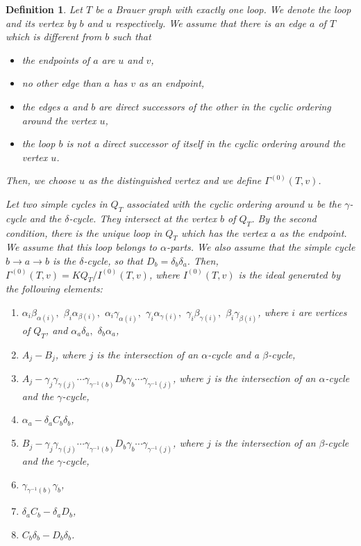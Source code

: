 \documentclass[12pt]{amsart}
\newtheorem{definition}[thm]{Definition}
\numberwithin{equation}{thm}
\newcounter{ni}
\begin{document}
\begin{definition}\label{D defn II}
Let $T$ be a Brauer graph with exactly one loop. 
We denote the loop and its vertex by $b$ and $u$ respectively. 
We assume that there is an edge $a$ of $T$ which is different from $b$ such that
\begin{itemize}
\item
the endpoints of $a$ are $u$ and $v$,
\item
no other edge than $a$ has $v$ as an endpoint,
\item
the edges $a$ and $b$ are direct successors of the other in the cyclic ordering around the vertex $u$,
\item
the loop $b$ is not a direct successor of itself in the cyclic ordering around the vertex $u$.
\end{itemize}
Then, we choose $u$ as the distinguished vertex and we define $\Gamma^{(0)}(T,v)$. 

Let two simple cycles in $Q_T$ associated with the cyclic ordering around $u$ be 
the $\gamma$-cycle and the $\delta$-cycle. They intersect at the vertex $b$ of $Q_T$. 
By the second condition, there is the unique loop in $Q_T$ which has the vertex $a$ as the endpoint. 
We assume that this loop belongs to $\alpha$-parts. We also assume that 
the simple cycle $b\to a \to b$ is the $\delta$-cycle, so that $D_b=\delta_b\delta_a$. Then,
$\Gamma^{(0)}(T,v) = KQ_T/I^{(0)}(T,v)$, where $I^{(0) }(T,v)$ is the ideal generated by the following elements:
\begin{enumerate}
\item $\alpha_i\beta_{\alpha(i)},$ $\beta_i\alpha_{\beta(i)},$ $\alpha_i\gamma_{\alpha(i)},$ $\gamma_i\alpha_{\gamma(i)},$  
$\gamma_i\beta_{\gamma(i)},$ $\beta_i\gamma_{\beta(i)}$, where $i$ are vertices of $Q_T$, and 
$\alpha_a\delta_a,$ $\delta_b\alpha_a$,
\item $A_j-B_j$, where $j$ is the intersection of an $\alpha$-cycle and a $\beta$-cycle,
\item $A_j-\gamma_j\gamma_{\gamma(j)}\cdots\gamma_{\gamma^{-1}(b)}D_b\gamma_b\cdots\gamma_{\gamma^{-1}(j)}$, 
where $j$ is the intersection of an $\alpha$-cycle and the $\gamma$-cycle,
\item $\alpha_{a} - \delta_{a}C_{b}\delta_{b}$,
\item $B_j-\gamma_j\gamma_{\gamma(j)}\cdots\gamma_{\gamma^{-1}(b)}D_b\gamma_b\cdots\gamma_{\gamma^{-1}(j)}$, 
where $j$ is the intersection of an $\beta$-cycle and the $\gamma$-cycle,
\item $\gamma_{\gamma^{-1}(b)}\gamma_{b}$,
\item $\delta_{a}C_{b}-\delta_{a}D_{b}$,
\item $C_{b}\delta_{b}-D_{b}\delta_{b}$.
\end{enumerate}
\end{definition}
\end{document}
